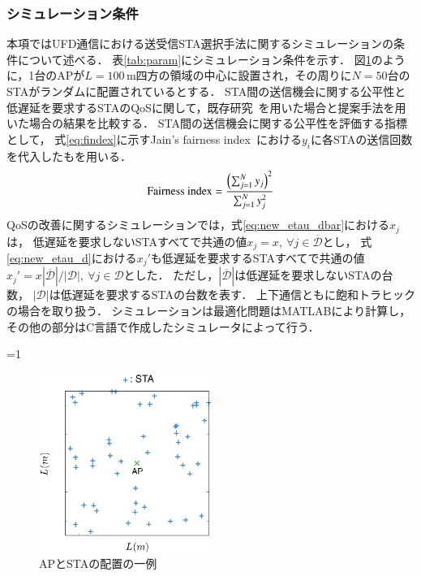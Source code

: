\documentclass[master]{kuisthesis}		%
\newcounter{flagFig}
\begin{document}
		\subsubsection{シミュレーション条件}
			本項ではUFD通信における送受信STA選択手法に関するシミュレーションの条件について述べる．
			表\ref{tab:param}にシミュレーション条件を示す．
			図\ref{fig:pos}のように，1台のAPが$L=100$\,m四方の領域の中心に設置され，その周りに$N=50$台のSTAがランダムに配置されているとする．
			STA間の送信機会に関する公平性と低遅延を要求するSTAのQoSに関して，既存研究~\cite{promac}を用いた場合と提案手法を用いた場合の結果を比較する．
			STA間の送信機会に関する公平性を評価する指標として，
			式\eqref{eq:findex}に示すJain's fairness index~\cite{jain}における$y_i$に各STAの送信回数を代入したもを用いる．
			\begin{equation}
				{\rm Fairness\ index} = \frac{\left(\sum_{j=1}^N y_j\right)^2}{\sum_{j=1}^N y_j^2} \label{eq:findex}
			\end{equation}
			QoSの改善に関するシミュレーションでは，式\eqref{eq:new_etau_dbar}における$x_j$は，
			低遅延を要求しないSTAすべてで共通の値$x_j=x,\ \forall j\in {\overline {\mathcal D}}$とし，
			式\eqref{eq:new_etau_d}における$x_j'$も低遅延を要求するSTAすべてで共通の値$x_j'=x|{\overline {\mathcal D}}|/|{\mathcal D}|,\ \forall j \in {\mathcal D}$とした．
			ただし，$|{\overline {\mathcal D}}|$は低遅延を要求しないSTAの台数，
			$|{\mathcal D}|$は低遅延を要求するSTAの台数を表す．
			上下通信ともに飽和トラヒックの場合を取り扱う．
			シミュレーションは最適化問題はMATLABにより計算し，その他の部分はC言語で作成したシミュレータによって行う．

			\ifnum\value{flagFig}=1 {\begin{figure}[htbp]
				\begin{center}
					\includegraphics[width=0.5\textwidth]{fig/pos.eps}
					\caption{APとSTAの配置の一例}
					\label{fig:pos}
				\end{center}
			\end{figure}}\fi
\end{document}
